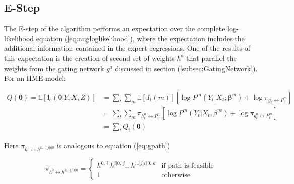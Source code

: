 \documentclass[12pt]{article}
\newcommand{\gateprod}[2]{\pi_{#1 \longleftrightarrow #2}}
\begin{document}


\subsection{E-Step}
The E-step of the algorithm performs an expectation over the complete
log-likelihood equation (\ref{eq:augloglikelihood}), where the expectation
includes the additional information contained in the expert regressions.
One of the results of this expectation is the creation of second set of
weights $h^{a}$ that parallel the weights from the gating network $g^{a}$
discussed in section (\ref{subsec:GatingNetwork}). For an HME model:

\begin{equation} \label{eq:Estep}
  \begin{split}
  Q(\boldsymbol{\theta}) = \mathbb{E} \left [ \boldsymbol{l}_{c}(\boldsymbol{\theta}|Y,X,Z) \right] & = \sum_{t}\sum_{m} \mathbb{E} \left[ I_{t}(m) \right] \left[ \log P^{m}(Y_{t}|X_{t}; \boldsymbol{\beta}^{m}) + \log \gateprod{g^{0}_{t}}{P^{m}_{t}} \right] \\ 
   & = \sum_{t} \sum_{m} \gateprod{h^{0}_{t}}{P^{m}_{t}} \left[ \log P^{m}(Y_{t}|X_{t},\beta^{m}) + \log \gateprod{g^{0}_{t}}{P^{m}_{t}} \right] \\
   & = \sum_{t} Q_{t}(\boldsymbol{\theta})
 \end{split}
\end{equation}

Here $\gateprod{h^{0}}{h^{k,\dots|j|i|0}}$ is analogous to equation (\ref{eq:gpath})

\begin{equation} \label{eq:hpath}
  \gateprod{h^{0}}{h^{k|\ldots|j|i|0}} =
    \begin{cases} 
       h^{0, \, i} \ h^{i|0, \, j} \ldots h^{\dots|j|i|0, \, k} & \textrm{if path is feasible} \\
       1 & \textrm{otherwise}
    \end{cases}
\end{equation}
\end{document}
